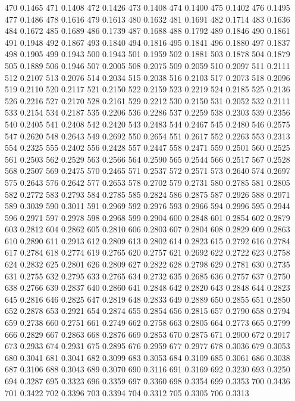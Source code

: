470 0.1465
471 0.1408
472 0.1426
473 0.1408
474 0.1400
475 0.1402
476 0.1495
477 0.1486
478 0.1616
479 0.1613
480 0.1632
481 0.1691
482 0.1714
483 0.1636
484 0.1672
485 0.1689
486 0.1739
487 0.1688
488 0.1792
489 0.1846
490 0.1861
491 0.1948
492 0.1867
493 0.1840
494 0.1816
495 0.1841
496 0.1880
497 0.1837
498 0.1905
499 0.1943
500 0.1943
501 0.1959
502 0.1881
503 0.1878
504 0.1879
505 0.1889
506 0.1946
507 0.2005
508 0.2075
509 0.2059
510 0.2097
511 0.2111
512 0.2107
513 0.2076
514 0.2034
515 0.2038
516 0.2103
517 0.2073
518 0.2096
519 0.2110
520 0.2117
521 0.2150
522 0.2159
523 0.2219
524 0.2185
525 0.2136
526 0.2216
527 0.2170
528 0.2161
529 0.2212
530 0.2150
531 0.2052
532 0.2111
533 0.2154
534 0.2187
535 0.2206
536 0.2286
537 0.2259
538 0.2303
539 0.2356
540 0.2405
541 0.2408
542 0.2420
543 0.2483
544 0.2467
545 0.2480
546 0.2575
547 0.2620
548 0.2643
549 0.2692
550 0.2654
551 0.2617
552 0.2263
553 0.2313
554 0.2325
555 0.2402
556 0.2428
557 0.2447
558 0.2471
559 0.2501
560 0.2525
561 0.2503
562 0.2529
563 0.2566
564 0.2590
565 0.2544
566 0.2517
567 0.2528
568 0.2507
569 0.2475
570 0.2465
571 0.2537
572 0.2571
573 0.2640
574 0.2697
575 0.2643
576 0.2642
577 0.2653
578 0.2702
579 0.2731
580 0.2785
581 0.2805
582 0.2772
583 0.2793
584 0.2785
585 0.2824
586 0.2875
587 0.2926
588 0.2971
589 0.3039
590 0.3011
591 0.2969
592 0.2976
593 0.2966
594 0.2996
595 0.2944
596 0.2971
597 0.2978
598 0.2968
599 0.2904
600 0.2848
601 0.2854
602 0.2879
603 0.2812
604 0.2862
605 0.2810
606 0.2803
607 0.2804
608 0.2829
609 0.2863
610 0.2890
611 0.2913
612 0.2809
613 0.2802
614 0.2823
615 0.2792
616 0.2784
617 0.2784
618 0.2774
619 0.2765
620 0.2757
621 0.2692
622 0.2722
623 0.2758
624 0.2832
625 0.2801
626 0.2809
627 0.2822
628 0.2798
629 0.2781
630 0.2735
631 0.2755
632 0.2795
633 0.2765
634 0.2732
635 0.2685
636 0.2757
637 0.2750
638 0.2766
639 0.2837
640 0.2860
641 0.2848
642 0.2820
643 0.2848
644 0.2823
645 0.2816
646 0.2825
647 0.2819
648 0.2833
649 0.2889
650 0.2855
651 0.2850
652 0.2878
653 0.2921
654 0.2874
655 0.2854
656 0.2815
657 0.2790
658 0.2794
659 0.2738
660 0.2751
661 0.2749
662 0.2758
663 0.2805
664 0.2773
665 0.2799
666 0.2829
667 0.2863
668 0.2876
669 0.2853
670 0.2875
671 0.2900
672 0.2917
673 0.2933
674 0.2931
675 0.2895
676 0.2959
677 0.2977
678 0.3036
679 0.3053
680 0.3041
681 0.3041
682 0.3099
683 0.3053
684 0.3109
685 0.3061
686 0.3038
687 0.3106
688 0.3043
689 0.3070
690 0.3116
691 0.3169
692 0.3230
693 0.3250
694 0.3287
695 0.3323
696 0.3359
697 0.3360
698 0.3354
699 0.3353
700 0.3436
701 0.3422
702 0.3396
703 0.3394
704 0.3312
705 0.3305
706 0.3313

